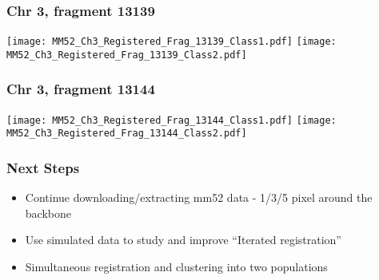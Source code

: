 \documentclass[10pt,dvipsnames,table]{beamer}
\begin{document}
\begin{frame}
\frametitle{Chr 3, fragment 13139 }
\begin{center}
\texttt{[image: MM52\_Ch3\_Registered\_Frag\_13139\_Class1.pdf]} 
\texttt{[image: MM52\_Ch3\_Registered\_Frag\_13139\_Class2.pdf]} 
\end{center}
\end{frame}

\begin{frame}
\frametitle{Chr 3, fragment 13144 }
\begin{center}
\texttt{[image: MM52\_Ch3\_Registered\_Frag\_13144\_Class1.pdf]} 
\texttt{[image: MM52\_Ch3\_Registered\_Frag\_13144\_Class2.pdf]} 
\end{center}
\end{frame}

\begin{frame}
\frametitle{Next Steps}
\begin{itemize}
\pause \item Continue downloading/extracting mm52 data - 1/3/5 pixel around the backbone
\pause \item Use simulated data to study and improve ``Iterated registration''
\pause \item Simultaneous registration and clustering into two populations
\end{itemize}
\end{frame}
\end{document}

